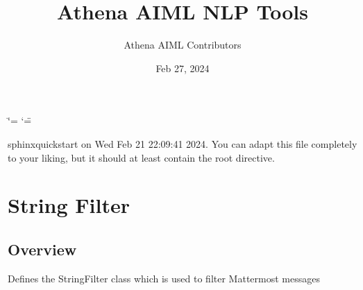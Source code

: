\documentclass[letterpaper,10pt,english]{sphinxmanual}
\title{Athena AIML NLP Tools}
\date{Feb 27, 2024}
\author{Athena AIML Contributors}
\begin{document}
\ifdefined\shorthandoff
  \ifnum\catcode`\=\string=\active\shorthandoff{=}\fi
  \ifnum\catcode`\"=\active{}\fi
\fi

\pagestyle{empty}
\sphinxmaketitle
\pagestyle{plain}
\sphinxtableofcontents
\pagestyle{normal}
\label{\detokenize{index::doc}}
\sphinxAtStartPar
sphinx\sphinxhyphen{}quickstart on Wed Feb 21 22:09:41 2024.
You can adapt this file completely to your liking, but it should at least
contain the root  directive.



\sphinxstepscope


\chapter{String Filter}
\label{\detokenize{filters:string-filter}}\label{\detokenize{filters::doc}}

\section{Overview}
\label{\detokenize{filters:module-at_nlp.filters.string_filter}}\label{\detokenize{filters:overview}}
\sphinxAtStartPar
Defines the StringFilter class which is used to filter Mattermost messages
\end{document}
